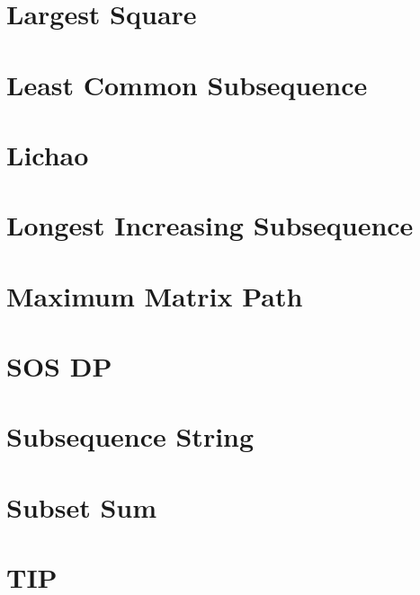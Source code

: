 

\section{Largest Square}




\section{Least Common Subsequence}




\section{Lichao}



\section{Longest Increasing Subsequence}



\section{Maximum Matrix Path}



\section{SOS DP}




\section{Subsequence String}



\section{Subset Sum}



\section{TIP}

